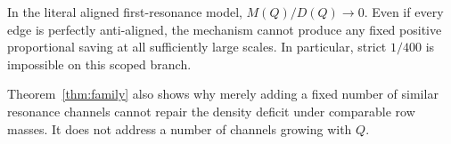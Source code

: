 \begin{corollary}
In the literal aligned first-resonance model, $M(Q)/D(Q)\to0$.  Even if every edge is
perfectly anti-aligned, the mechanism cannot produce any fixed positive proportional
saving at all sufficiently large scales.  In particular, strict $1/400$ is impossible
on this scoped branch.
\end{corollary}

Theorem~\ref{thm:family} also shows why merely adding a fixed number of similar
resonance channels cannot repair the density deficit under comparable row masses.
It does not address a number of channels growing with $Q$.
